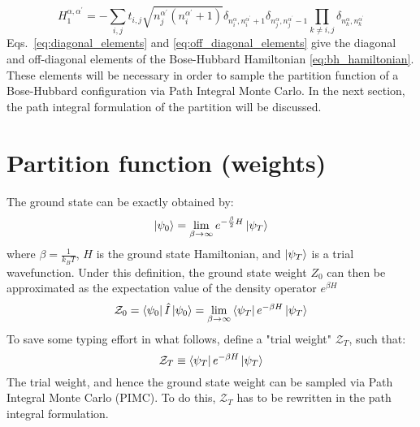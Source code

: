 \documentclass[12pt, two sided]{article}
\begin{document}
%
\begin{equation}
\label{eq:off_diagonal_elements}
H_1^{\alpha,\alpha^\prime} = -\sum_{i,j} t_{i,j}  \sqrt{n_j^{\alpha^\prime}(n_i^{\alpha^\prime}+1)} \delta_{n_i^{\alpha}, n_i^{\alpha^\prime}+1} \delta_{n_j^{\alpha},n_j^{\alpha^\prime}-1} \prod_{k \neq i,j} \delta_{n_k^{\alpha},n_k^{\alpha^\prime}}
\end{equation}
%
Eqs.~\eqref{eq:diagonal_elements} and \eqref{eq:off_diagonal_elements} give the diagonal and off-diagonal elements of the Bose-Hubbard Hamiltonian \eqref{eq:bh_hamiltonian}. These elements will be necessary in order to sample the partition function of a Bose-Hubbard configuration via Path Integral Monte Carlo. In the next section, the path integral formulation of the partition will be discussed.
 
\section{Partition function (weights)}

The ground state can be exactly obtained by:
%
\begin{equation}
\ket{\psi_0} = \lim_{\beta\to\infty} e^{-\frac{\beta}{2} H}\ket{\psi_T} 
\end{equation}
%
where $\beta = \frac{1}{k_B  T}$, $H$ is the ground state Hamiltonian, and $\ket{\psi_T}$ is a trial wavefunction. Under this definition, the ground state weight $Z_0$ can then be approximated as the expectation value of the density operator $e^{\beta H}$
%
\begin{equation}
\label{eq:z_0_01}
\mathcal{Z}_0 = \bra{\psi_0} \hat{I} \ket{\psi_0} = \lim_{\beta\to\infty} \bra{\psi_T} e^{-\beta H} \ket{\psi_T}
\end{equation}
%
To save some typing effort in what follows, define a "trial weight" $\mathcal{Z}_T$, such that:
%
\begin{equation}
\mathcal{Z}_T \equiv  \bra{\psi_T} e^{-\beta H} \ket{\psi_T}
\end{equation}
%
The trial weight, and hence the ground state weight can be sampled via Path Integral Monte Carlo (PIMC). To do this, $\mathcal{Z}_T$ has to be rewritten in the path integral formulation.
\end{document}
